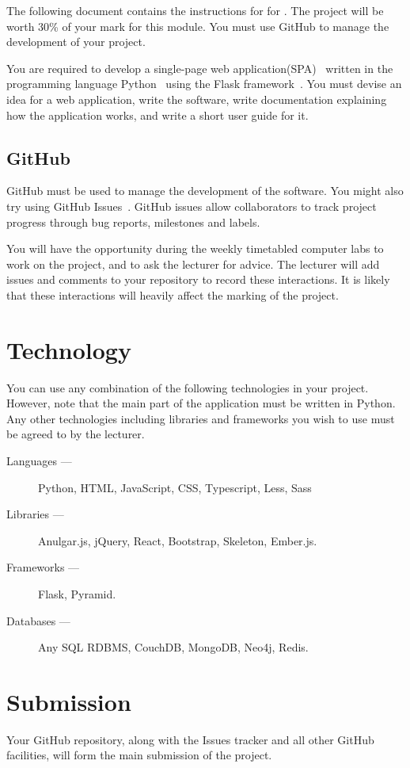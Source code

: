 \noindent
The following document contains the instructions for \projectname{} for \modulename{}.
The project will be worth 30\% of your mark for this module.
You must use GitHub to manage the development of your project.

You are required to develop a single-page web application(SPA)~\cite{singlepageapps} written in the programming language Python~\cite{pythonorg} using the Flask framework~\cite{pythonflask}.
You must devise an idea for a web application, write the software, write documentation explaining how the application works, and write a short user guide for it.

\subsection*{GitHub}
GitHub must be used to manage the development of the software.
You might also try using GitHub Issues~\cite{githubissues}.
GitHub issues allow collaborators to track project progress through bug reports, milestones and labels.

You will have the opportunity during the weekly timetabled computer labs to work on the project, and to ask the lecturer for advice.
The lecturer will add issues and comments to your repository to record these interactions.
It is likely that these interactions will heavily affect the marking of the project.

\section*{Technology}
You can use any combination of the following technologies in your project.
However, note that the main part of the application must be written in Python.
Any other technologies including libraries and frameworks you wish to use must be agreed to by the lecturer.

\begin{description}
\item[Languages ---] Python, HTML, JavaScript, CSS, Typescript, Less, Sass
\item[Libraries ---] Anulgar.js, jQuery, React, Bootstrap, Skeleton, Ember.js.
\item[Frameworks ---] Flask, Pyramid.
\item[Databases ---] Any SQL RDBMS, CouchDB, MongoDB, Neo4j, Redis.
\end{description}

\section*{Submission}
Your GitHub repository, along with the Issues tracker and all other GitHub facilities, will form the main submission of the project.

